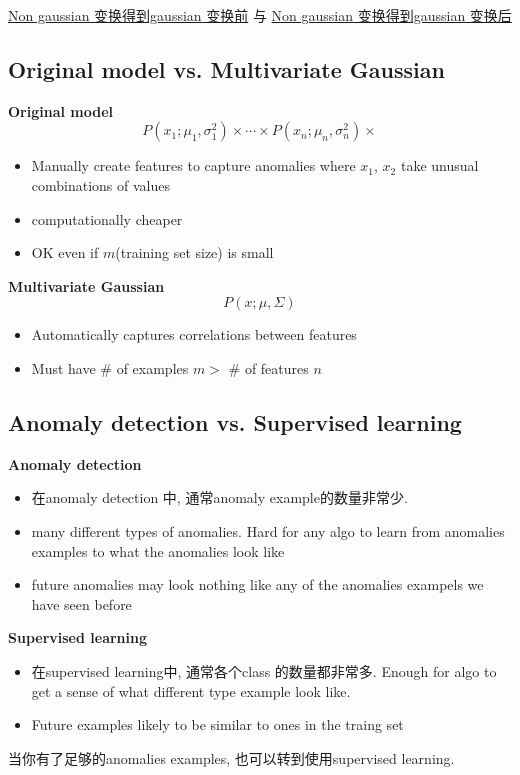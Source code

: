 \documentclass{article}
\begin{document}
\href{http://i.imgbox.com/FwxhHtty.png}{Non gaussian 变换得到gaussian 变换前}
与
\href{http://i.imgbox.com/UbClvoyV.png}{Non gaussian 变换得到gaussian 变换后}

\subsection{Original model vs. Multivariate Gaussian}
\textbf{Original model}
$$ P(x_1; \mu_1, \sigma_1^2) \times \cdots \times P(x_n; \mu_n, \sigma_n^2) \times $$
\begin{itemize}
\item Manually create features to capture anomalies where $x_1$, $x_2$ take unusual combinations of values
\item computationally cheaper
\item OK even if $m$(training set size) is small
\end{itemize}

\textbf{Multivariate Gaussian}
$$P(x; \mu, \Sigma)$$
\begin{itemize}
\item Automatically captures correlations between features
\item Must have \# of examples $m >$  \# of features $n$
\end{itemize}

\subsection{Anomaly detection vs. Supervised learning}
\textbf{Anomaly detection}
\begin{itemize}
\item 在anomaly detection 中, 通常anomaly example的数量非常少.
\item many different types of anomalies. Hard for any algo to learn from anomalies examples to what the anomalies look like
\item future anomalies may look nothing like any of the anomalies exampels we have seen before
\end{itemize}

\textbf{Supervised learning}
\begin{itemize}
\item 在supervised learning中, 通常各个class 的数量都非常多. Enough for algo to get a sense of what different type example look like.
\item Future examples likely to be similar to ones in the traing set
\end{itemize}

当你有了足够的anomalies examples, 也可以转到使用supervised learning.
\end{document}
